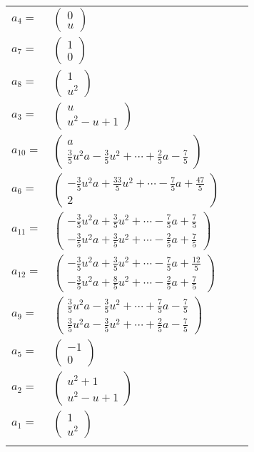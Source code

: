\documentclass[1p]{elsarticle_modified}
\theoremstyle{definition}
\begin{document}
\begin{tabular}{m{7pt} m{180pt} m{7pt} m{180pt} }
\flushright $a_{4}=$&$\begin{pmatrix}0\\u\end{pmatrix}$ \\
\flushright $a_{7}=$&$\begin{pmatrix}1\\0\end{pmatrix}$ \\
\flushright $a_{8}=$&$\begin{pmatrix}1\\u^2\end{pmatrix}$ \\
\flushright $a_{3}=$&$\begin{pmatrix}u\\u^2- u+1\end{pmatrix}$ \\
\flushright $a_{10}=$&$\begin{pmatrix}a\\\frac{3}{5} u^2 a-\frac{3}{5} u^2+\cdots+\frac{2}{5} a-\frac{7}{5}\end{pmatrix}$ \\
\flushright $a_{6}=$&$\begin{pmatrix}-\frac{3}{5} u^2 a+\frac{33}{5} u^2+\cdots-\frac{7}{5} a+\frac{47}{5}\\2\end{pmatrix}$ \\
\flushright $a_{11}=$&$\begin{pmatrix}-\frac{3}{5} u^2 a+\frac{3}{5} u^2+\cdots-\frac{7}{5} a+\frac{7}{5}\\-\frac{3}{5} u^2 a+\frac{3}{5} u^2+\cdots-\frac{2}{5} a+\frac{7}{5}\end{pmatrix}$ \\
\flushright $a_{12}=$&$\begin{pmatrix}-\frac{3}{5} u^2 a+\frac{3}{5} u^2+\cdots-\frac{7}{5} a+\frac{12}{5}\\-\frac{3}{5} u^2 a+\frac{8}{5} u^2+\cdots-\frac{2}{5} a+\frac{7}{5}\end{pmatrix}$ \\
\flushright $a_{9}=$&$\begin{pmatrix}\frac{3}{5} u^2 a-\frac{3}{5} u^2+\cdots+\frac{7}{5} a-\frac{7}{5}\\\frac{3}{5} u^2 a-\frac{3}{5} u^2+\cdots+\frac{2}{5} a-\frac{7}{5}\end{pmatrix}$ \\
\flushright $a_{5}=$&$\begin{pmatrix}-1\\0\end{pmatrix}$ \\
\flushright $a_{2}=$&$\begin{pmatrix}u^2+1\\u^2- u+1\end{pmatrix}$ \\
\flushright $a_{1}=$&$\begin{pmatrix}1\\u^2\end{pmatrix}$\\&\end{tabular}
\end{document}
